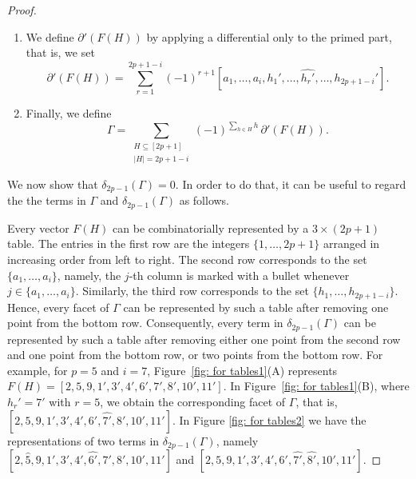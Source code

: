 \documentclass[12pt]{amsart}
\begin{document}
\begin{proof}
\begin{enumerate}
\item We define $\partial'(F(H))$ by applying a differential only to the primed part, that is, we set
\[
\partial'(F(H))
=
\sum_{r=1}^{2p+1-i}
(-1)^{r+1}
[a_1,\ldots,a_i,h_1',\ldots,\widehat{h_r'},\ldots,h_{2p+1-i}'].
\]

\item Finally, we define
$$
\Gamma
=
\sum_{\substack{H\subseteq [2p+1]\\ |H|=2p+1-i}}
(-1)^{\sum_{h\in H} h}
\,\partial'(F(H)).
$$
\end{enumerate}

We now show that $\delta_{2p-1}(\Gamma)=0$. In order to do that, it can be useful to regard the the terms in $\Gamma$ and $\delta_{2p-1}(\Gamma)$ as follows.

Every vector $F(H)$ can be combinatorially represented by a $3 \times (2p+1)$ table. The entries in the first row are the integers $\{1,\dots,2p+1\}$ arranged in increasing order from left to right. The second row corresponds to the set $\{a_1,\dots,a_i\}$, namely, the $j$-th column is marked with a bullet whenever $j\in \{a_1,\dots,a_i\}$. Similarly, the third row corresponds to the set $\{h_1,\dots,h_{2p+1-i}\}$. Hence, every facet of $\Gamma$ can be represented by such a table after removing one point from the bottom row. Consequently, every term in $\delta_{2p-1}(\Gamma)$ can be represented by such a table after removing either one point from the second row and one point from the bottom row, or two points from the bottom row. For example, for $p=5$ and $i=7$, Figure~\ref{fig: for tables1}(A) represents
$F(H)=[2,5,9,1',3',4',6',7',8',10',11']$.
In Figure~\ref{fig: for tables1}(B), where $h_r'=7'$ with $r=5$, we obtain the corresponding facet of $\Gamma$, that is,
$[2,5,9,1',3',4',6',\widehat{7'},8',10',11']$. In Figure \ref{fig: for tables2} we have the representations of two terms in $\delta_{2p-1}(\Gamma)$, namely $[2,\widehat{5},9,1',3',4',\widehat{6'},7',8',10',11']$ and $[2,5,9,1',3',4',6',\widehat{7'},\widehat{8'},10',11']$.


\end{proof}
\end{document}

